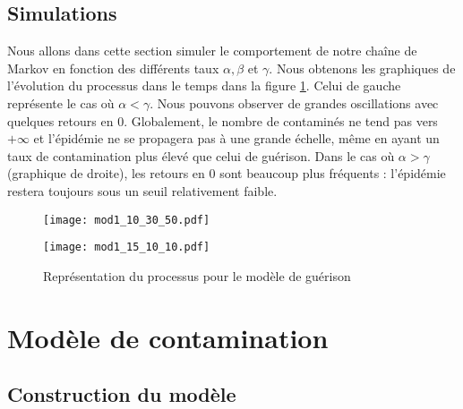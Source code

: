 \documentclass[12pt,a4paper]{report}
\theoremstyle{remark}
\begin{document}
\subsection{Simulations}
\vspace{0.6cm}

Nous allons dans cette section simuler le comportement de notre chaîne de Markov en fonction des différents taux $\alpha, \beta$ et $ \gamma$. Nous obtenons les graphiques de l'évolution du processus dans le temps dans la figure \ref{fig_guerison}. Celui de gauche représente le cas où $\alpha < \gamma$. Nous pouvons observer de grandes oscillations avec quelques retours en $0$. Globalement, le nombre de contaminés ne tend pas vers $+\infty$ et l'épidémie ne se propagera pas à une grande échelle, même en ayant un taux de contamination plus élevé que celui de guérison. Dans le cas où $\alpha > \gamma$ (graphique de droite), les retours en $0$ sont beaucoup plus fréquents : l'épidémie restera toujours sous un seuil relativement faible.

\begin{figure}[h]
    \begin{minipage}[c]{0.25\linewidth}
        \centering
        \texttt{[image: mod1\_10\_30\_50.pdf]}
    \end{minipage}
    \hfill%
    \vspace{0.1cm}
    \begin{minipage}[c]{0.50\linewidth}
        \centering
       \texttt{[image: mod1\_15\_10\_10.pdf]}
    \end{minipage}
    \caption{Représentation du processus pour le modèle de guérison}
    \label{fig_guerison}
\end{figure}  


\section{Modèle de contamination}

\subsection{Construction du modèle}
\vspace{0.6cm}
\end{document}
